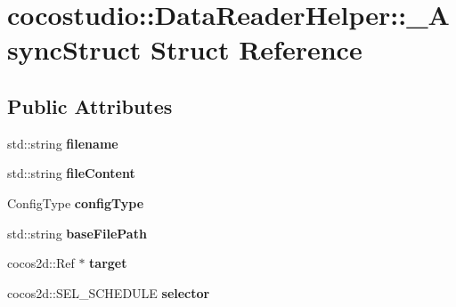 \hypertarget{structcocostudio_1_1DataReaderHelper_1_1__AsyncStruct}{}\section{cocostudio\+:\+:Data\+Reader\+Helper\+:\+:\+\_\+\+Async\+Struct Struct Reference}
\label{structcocostudio_1_1DataReaderHelper_1_1__AsyncStruct}
\subsection*{Public Attributes}
\begin{DoxyCompactItemize}
\item 
\mbox{\label{structcocostudio_1_1DataReaderHelper_1_1__AsyncStruct_a175d1a1b1e197ec5d87ce73a62bad34f}} 
std\+::string {\bfseries filename}
\item 
\mbox{\label{structcocostudio_1_1DataReaderHelper_1_1__AsyncStruct_a23b30620b58933850727a17382e9f079}} 
std\+::string {\bfseries file\+Content}
\item 
\mbox{\label{structcocostudio_1_1DataReaderHelper_1_1__AsyncStruct_ae8100158c7ae92bfd8d4e7ff49fe3823}} 
Config\+Type {\bfseries config\+Type}
\item 
\mbox{\label{structcocostudio_1_1DataReaderHelper_1_1__AsyncStruct_a6bd3f43d56d915d798f2b1c6bf71fd41}} 
std\+::string {\bfseries base\+File\+Path}
\item 
\mbox{\label{structcocostudio_1_1DataReaderHelper_1_1__AsyncStruct_a450338a55d839c855971c4b4edf724cb}} 
cocos2d\+::\+Ref $\ast$ {\bfseries target}
\item 
\mbox{\label{structcocostudio_1_1DataReaderHelper_1_1__AsyncStruct_a80484d93663e766e4da56ac39f59eb07}} 
cocos2d\+::\+S\+E\+L\+\_\+\+S\+C\+H\+E\+D\+U\+LE {\bfseries selector}
\item 

\end{DoxyCompactItemize}
